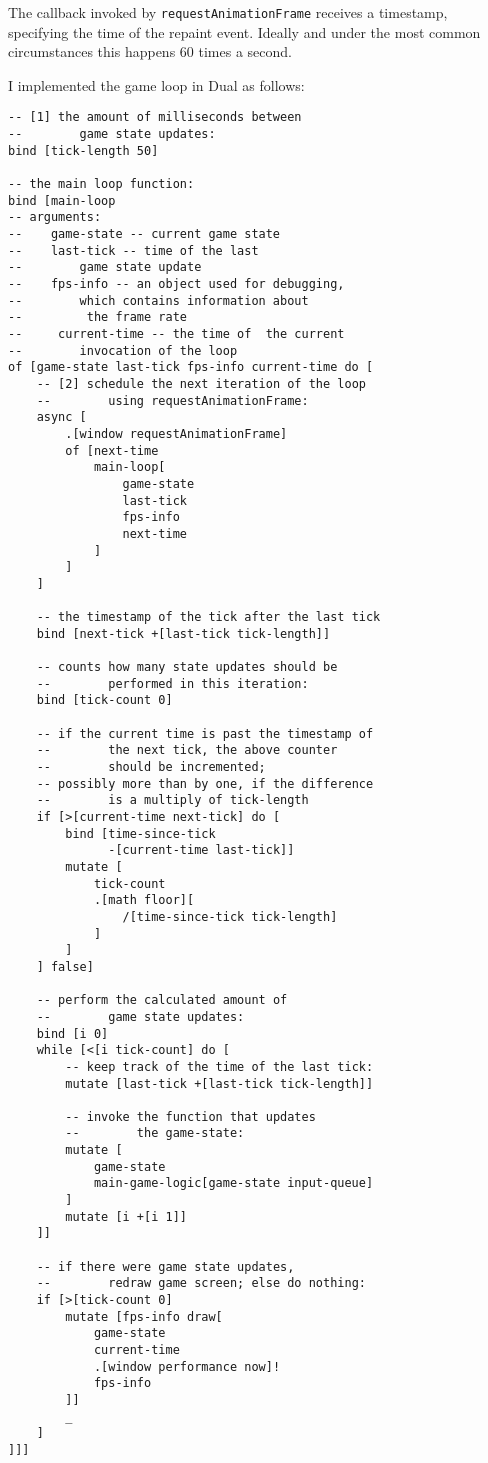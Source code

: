 The callback invoked by \texttt{requestAnimationFrame} receives a timestamp, specifying the time of the repaint event. Ideally and under the most common circumstances this happens 60 times a second.

I implemented the game loop in Dual as follows:
\begin{lstlisting}
-- [1] the amount of milliseconds between
--        game state updates:
bind [tick-length 50]

-- the main loop function:
bind [main-loop
-- arguments:
--    game-state -- current game state
--    last-tick -- time of the last
--        game state update
--    fps-info -- an object used for debugging,
--        which contains information about
--         the frame rate
--     current-time -- the time of  the current
--        invocation of the loop
of [game-state last-tick fps-info current-time do [
    -- [2] schedule the next iteration of the loop
    --        using requestAnimationFrame:
    async [
        .[window requestAnimationFrame]
        of [next-time
            main-loop[
                game-state
                last-tick
                fps-info
                next-time
            ]
        ]
    ]
    
    -- the timestamp of the tick after the last tick
    bind [next-tick +[last-tick tick-length]]
    
    -- counts how many state updates should be
    --        performed in this iteration:
    bind [tick-count 0]
    
    -- if the current time is past the timestamp of
    --        the next tick, the above counter
    --        should be incremented;
    -- possibly more than by one, if the difference
    --        is a multiply of tick-length
    if [>[current-time next-tick] do [
        bind [time-since-tick
              -[current-time last-tick]]
        mutate [
            tick-count
            .[math floor][
                /[time-since-tick tick-length]
            ]
        ]
    ] false]
    
    -- perform the calculated amount of
    --        game state updates:
    bind [i 0]
    while [<[i tick-count] do [
        -- keep track of the time of the last tick:
        mutate [last-tick +[last-tick tick-length]]
        
        -- invoke the function that updates
        --        the game-state:
        mutate [
            game-state
            main-game-logic[game-state input-queue]
        ]
        mutate [i +[i 1]]
    ]]

    -- if there were game state updates,
    --        redraw game screen; else do nothing:
    if [>[tick-count 0]
        mutate [fps-info draw[
            game-state
            current-time
            .[window performance now]!
            fps-info
        ]]
        _
    ]
]]]
\end{lstlisting}


